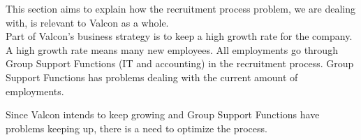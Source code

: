 This section aims to explain how the recruitment process problem, we are dealing with, is relevant to Valcon as a whole.\\

\noindent Part of Valcon's business strategy is to keep a high growth rate for the company.
A high growth rate means many new employees.
All employments go through Group Support Functions (IT and accounting) in the recruitment process.
Group Support Functions has problems dealing with the current amount of employments.

Since Valcon intends to keep growing and Group Support Functions have problems keeping up, there is a need to optimize the process.